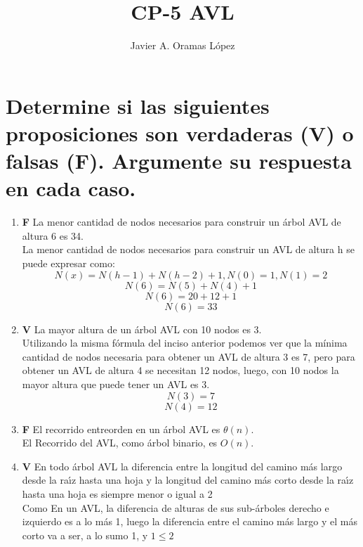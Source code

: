 \documentclass[10pt,a4paper]{article}
\author{Javier A. Oramas López}
\title{CP-5 AVL}
\begin{document}
    \maketitle

    \section{ Determine si las siguientes proposiciones son verdaderas (V) o falsas (F). Argumente su respuesta en cada caso.}
        \begin{enumerate}
            \item \textbf{F} La menor cantidad de nodos necesarios para construir un árbol AVL de altura 6 es 34. \\
                La menor cantidad de nodos necesarios para construir un AVL de altura h se puede expresar como:\\
                \[N(x) = N(h-1) + N(h-2) + 1, N(0) = 1, N(1) = 2\]
                \[N(6) = N(5) + N(4) + 1\]
                \[N(6) = 20 + 12 + 1\]
                \[N(6) = 33\]
            \item \textbf{V} La mayor altura de un árbol AVL con 10 nodos es 3.\\
                Utilizando la misma fórmula del inciso anterior podemos ver que la mínima cantidad de nodos necesaria para
                obtener un AVL de altura 3 es 7, pero para obtener un AVL de altura 4 se necesitan 12 nodos, luego, con 10 
                nodos la mayor altura que puede tener un AVL es 3.
                \[N(3) = 7\]
                \[N(4) = 12\]
            \item \textbf{F} El recorrido entreorden en un árbol AVL es $\theta(n)$.\\
                El Recorrido del AVL, como árbol binario, es $O(n)$.
            
            \item \textbf{V} En todo árbol AVL la diferencia entre la longitud del camino más largo desde la raı́z hasta una hoja
            y la longitud del camino más corto desde la raı́z hasta una hoja es siempre menor o igual a 2\\
                Como En un AVL, la diferencia de alturas de sus sub-árboles derecho e izquierdo es a lo más 1, luego la diferencia
                entre el camino más largo y el más corto va a ser, a lo sumo 1, y $1 \leq 2$
            \end{enumerate}
\end{document}
